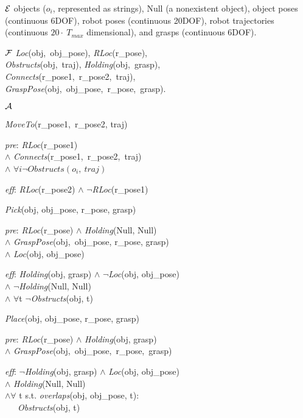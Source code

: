 \begin{tightlist}
\item[$\mathcal{E}$] objects ($o_i$, represented as strings), Null (a
  nonexistent object), object poses (continuous 6DOF), robot poses
  (continuous 20DOF), robot trajectories (continuous $20\cdot~T_{max}$ dimensional),
  and grasps (continuous 6DOF).
\item[$\mathcal{F}$] \emph{Loc}(obj,~obj\_pose), \emph{RLoc}(r\_pose),
  \\\emph{Obstructs}(obj,~traj), \emph{Holding}(obj,~grasp),
  \\\emph{Connects}(r\_pose1,~r\_pose2,~traj),
  \\\emph{GraspPose}(obj,~obj\_pose,~r\_pose,~grasp).
\item[$\mathcal{A}$] \begin{tightlist} \item \emph{MoveTo}(r\_pose1,~r\_pose2, traj)
\begin{tightlist}
   \item[\emph{pre}:] \emph{RLoc}(r\_pose1) \\$\wedge$ \emph{Connects}(r\_pose1,~r\_pose2,~traj) \\$\wedge$ $\forall i \lnot Obstructs(o_i,~traj)$
   \item[\emph{eff}:] \emph{RLoc}(r\_pose2) $\wedge$ $\lnot$\emph{RLoc}(r\_pose1)
\end{tightlist}
\item \emph{Pick}(obj, obj\_pose, r\_pose, grasp)
\begin{tightlist}
   \item[\emph{pre}:] \emph{RLoc}(r\_pose) $\wedge$ \emph{Holding}(Null, Null) \\$\wedge$ \emph{GraspPose}(obj,~obj\_pose, r\_pose, grasp) \\$\wedge$ \emph{Loc}(obj, obj\_pose)
   \item[\emph{eff}:] \emph{Holding}(obj, grasp) $\wedge$ $\lnot$\emph{Loc}(obj, obj\_pose) \\$\wedge$ $\lnot$\emph{Holding}(Null, Null) \\$\wedge$ $\forall$t $\lnot$\emph{Obstructs}(obj, t)
\end{tightlist}
\item \emph{Place}(obj, obj\_pose, r\_pose, grasp)
\begin{tightlist}
   \item[\emph{pre}:] \emph{RLoc}(r\_pose) $\wedge$ \emph{Holding}(obj, grasp) \\ $\wedge$ \emph{GraspPose}(obj,~obj\_pose,~r\_pose,~grasp)
   \item[\emph{eff}:] $\lnot$\emph{Holding}(obj, grasp) $\wedge$ \emph{Loc}(obj, obj\_pose) \\$\wedge$ \emph{Holding}(Null, Null)\\ $\wedge \forall$ t s.t. \emph{overlaps}(obj, obj\_pose, t): \\ \indent \indent \ \ \ \emph{Obstructs}(obj, t)
\end{tightlist}
\end{tightlist}
\end{tightlist}
